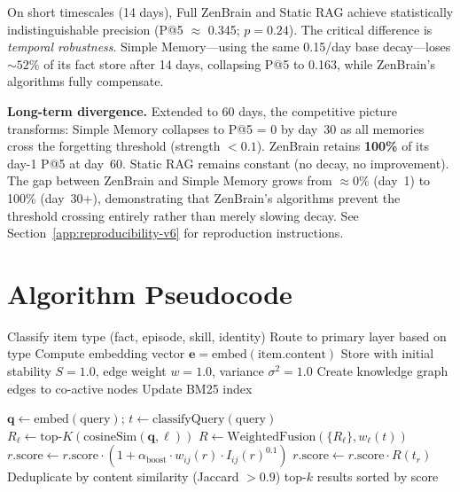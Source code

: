 \documentclass{article}
\begin{document}
On short timescales (14 days), Full ZenBrain and Static RAG achieve
statistically indistinguishable precision (P@5 $\approx$ 0.345; $p = 0.24$).
The critical difference is \emph{temporal robustness}.
Simple Memory---using the same 0.15/day base decay---loses ${\sim}52$\%
of its fact store after 14 days, collapsing P@5 to 0.163,
while ZenBrain's algorithms fully compensate.

\textbf{Long-term divergence.}
Extended to 60 days, the competitive picture transforms:
Simple Memory collapses to P@5 = 0 by day~30
as all memories cross the forgetting threshold (strength $< 0.1$).
ZenBrain retains \textbf{100\%} of its day-1 P@5 at day~60.
Static RAG remains constant (no decay, no improvement).
The gap between ZenBrain and Simple Memory grows from
$\approx$0\% (day~1) to 100\% (day~30+), demonstrating that
ZenBrain's algorithms prevent the threshold crossing entirely
rather than merely slowing decay.
See Section~\ref{app:reproducibility-v6} for reproduction instructions.

\section{Algorithm Pseudocode}
\label{app:algorithms}

\begin{algorithm}[H]
\caption{MemoryCoordinator.store(item)}
\begin{algorithmic}[1]
\STATE Classify item type (fact, episode, skill, identity)
\STATE Route to primary layer based on type
\STATE Compute embedding vector $\mathbf{e} = \text{embed}(\text{item.content})$
\STATE Store with initial stability $S = 1.0$, edge weight $w = 1.0$, variance $\sigma^2 = 1.0$
\STATE Create knowledge graph edges to co-active nodes
\STATE Update BM25 index
\end{algorithmic}
\end{algorithm}

\begin{algorithm}[H]
\caption{MemoryCoordinator.recall(query)}
\begin{algorithmic}[1]
\STATE $\mathbf{q} \leftarrow \text{embed}(\text{query})$; $t \leftarrow \text{classifyQuery}(\text{query})$
    \STATE $R_\ell \leftarrow \text{top-}K(\text{cosineSim}(\mathbf{q}, \ell))$
\ENDFOR
\STATE $R \leftarrow \text{WeightedFusion}(\{R_\ell\}, w_\ell(t))$ 
    \STATE $r.\text{score} \leftarrow r.\text{score} \cdot (1 + \alpha_{\mathrm{boost}} \cdot w_{ij}(r) \cdot I_{ij}(r)^{0.1})$ 
    \STATE $r.\text{score} \leftarrow r.\text{score} \cdot R(t_r)$ 
\ENDFOR
\STATE Deduplicate by content similarity (Jaccard $> 0.9$)
\RETURN top-$k$ results sorted by score
\end{algorithmic}
\end{algorithm}
\end{document}
